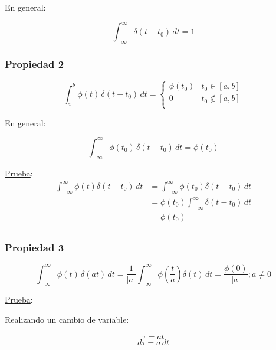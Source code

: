 En general:

\begin{equation*}
    \int_{-\infty}^{\infty}\delta(t-t_0)\,dt=1
\end{equation*}

\subsubsection*{Propiedad 2}

\begin{equation*}
    \int_a^b \phi(t)\,\delta(t-t_0)\,dt=\begin{cases}
        \phi(t_0) & t_0\in[a,b] \\
        0 & t_0\notin[a,b] \\
    \end{cases}
\end{equation*}

En general:

\begin{equation*}
    \int_{-\infty}^{\infty}\phi(t_0)\,\delta(t-t_0)\,dt=\phi(t_0)
\end{equation*}

\underline{Prueba}:
\begin{equation*}
\begin{split}
    \int_{-\infty}^{\infty}\phi(t)\delta(t-t_0)\,dt
        &=\int_{-\infty}^{\infty}\phi(t_0)\delta(t-t_0)\,dt\\
        &=\phi(t_0)\int_{-\infty}^{\infty}\delta(t-t_0)\,dt\\
        &=\phi(t_0)\\
\end{split}
\end{equation*}

\subsubsection*{Propiedad 3}

\begin{equation*}
    \int_{-\infty}^{\infty}\phi(t)\,\delta(at)\,dt
        =\frac{1}{|a|}\int_{-\infty}^{\infty}
            \phi\left(\frac{t}{a}\right)\delta(t)\,dt
        =\frac{\phi(0)}{|a|}; a\neq0
\end{equation*}

\underline{Prueba}:

Realizando un cambio de variable:

\begin{equation*}
    \tau=at
\end{equation*}
\begin{equation*}
    d\tau=a\,dt
\end{equation*}

